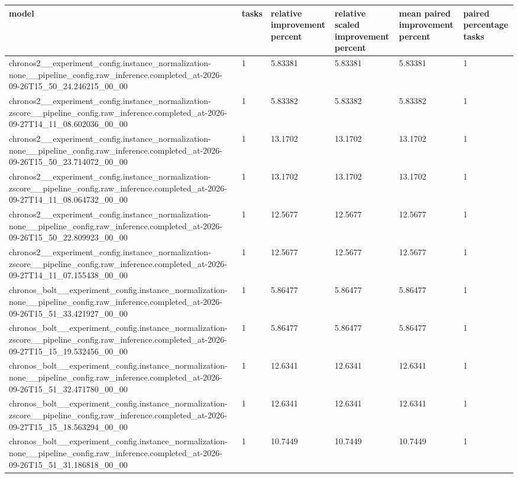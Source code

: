 \begin{tabular}{llllll}
\toprule
model & tasks & relative improvement percent & relative scaled improvement percent & mean paired improvement percent & paired percentage tasks \\
\midrule
chronos2\_\_experiment\_config.instance\_normalization-none\_\_pipeline\_config.raw\_inference.completed\_at-2026-09-26T15\_50\_24.246215\_00\_00 & 1 & 5.83381 & 5.83381 & 5.83381 & 1 \\
chronos2\_\_experiment\_config.instance\_normalization-zscore\_\_pipeline\_config.raw\_inference.completed\_at-2026-09-27T14\_11\_08.602036\_00\_00 & 1 & 5.83382 & 5.83382 & 5.83382 & 1 \\
chronos2\_\_experiment\_config.instance\_normalization-none\_\_pipeline\_config.raw\_inference.completed\_at-2026-09-26T15\_50\_23.714072\_00\_00 & 1 & 13.1702 & 13.1702 & 13.1702 & 1 \\
chronos2\_\_experiment\_config.instance\_normalization-zscore\_\_pipeline\_config.raw\_inference.completed\_at-2026-09-27T14\_11\_08.064732\_00\_00 & 1 & 13.1702 & 13.1702 & 13.1702 & 1 \\
chronos2\_\_experiment\_config.instance\_normalization-none\_\_pipeline\_config.raw\_inference.completed\_at-2026-09-26T15\_50\_22.809923\_00\_00 & 1 & 12.5677 & 12.5677 & 12.5677 & 1 \\
chronos2\_\_experiment\_config.instance\_normalization-zscore\_\_pipeline\_config.raw\_inference.completed\_at-2026-09-27T14\_11\_07.155438\_00\_00 & 1 & 12.5677 & 12.5677 & 12.5677 & 1 \\
chronos\_bolt\_\_experiment\_config.instance\_normalization-none\_\_pipeline\_config.raw\_inference.completed\_at-2026-09-26T15\_51\_33.421927\_00\_00 & 1 & 5.86477 & 5.86477 & 5.86477 & 1 \\
chronos\_bolt\_\_experiment\_config.instance\_normalization-zscore\_\_pipeline\_config.raw\_inference.completed\_at-2026-09-27T15\_15\_19.532456\_00\_00 & 1 & 5.86477 & 5.86477 & 5.86477 & 1 \\
chronos\_bolt\_\_experiment\_config.instance\_normalization-none\_\_pipeline\_config.raw\_inference.completed\_at-2026-09-26T15\_51\_32.471780\_00\_00 & 1 & 12.6341 & 12.6341 & 12.6341 & 1 \\
chronos\_bolt\_\_experiment\_config.instance\_normalization-zscore\_\_pipeline\_config.raw\_inference.completed\_at-2026-09-27T15\_15\_18.563294\_00\_00 & 1 & 12.6341 & 12.6341 & 12.6341 & 1 \\
chronos\_bolt\_\_experiment\_config.instance\_normalization-none\_\_pipeline\_config.raw\_inference.completed\_at-2026-09-26T15\_51\_31.186818\_00\_00 & 1 & 10.7449 & 10.7449 & 10.7449 & 1 \\

\end{tabular}
